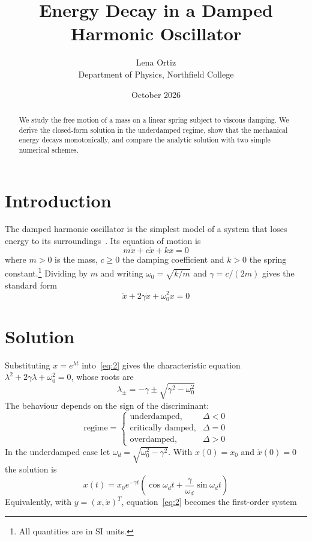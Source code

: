 \documentclass[11pt,a4paper]{article}
\title{Energy Decay in a Damped Harmonic Oscillator}
\author{Lena Ortiz\\ \small Department of Physics, Northfield College}
\date{October 2026}
\begin{document}
\maketitle

\begin{abstract}
We study the free motion of a mass on a linear spring subject to viscous damping. We derive the closed-form solution in the underdamped regime, show that the mechanical energy decays monotonically, and compare the analytic solution with two simple numerical schemes.
\end{abstract}

\section{Introduction}

The damped harmonic oscillator is the simplest model of a system that loses energy to its surroundings~\cite{ref1}. Its equation of motion is
\begin{equation}
  m\ddot{x}+c\dot{x}+kx=0
  \label{eq:1}
\end{equation}
where $m>0$ is the mass, $c\geq0$ the damping coefficient and $k>0$ the spring constant.\footnote{All quantities are in SI units.} Dividing by $m$ and writing $\omega_{0}=\sqrt{k/m}$ and $\gamma=c/(2m)$ gives the standard form
\begin{equation}
  \ddot{x}+2\gamma\dot{x}+\omega_{0}^{2}x=0
  \label{eq:2}
\end{equation}

\section{Solution}

Substituting $x=e^{\lambda t}$ into~\eqref{eq:2} gives the characteristic equation $\lambda^{2}+2\gamma\lambda+\omega_{0}^{2}=0$, whose roots are
\begin{equation}
  \lambda_{\pm}=-\gamma\pm\sqrt{\gamma^{2}-\omega_{0}^{2}}
\end{equation}
The behaviour depends on the sign of the discriminant:
\begin{equation*}
  \text{regime}=\begin{cases}
\text{underdamped}, & \Delta<0 \\
\text{critically damped}, & \Delta=0 \\
\text{overdamped}, & \Delta>0
\end{cases}
\end{equation*}
In the underdamped case let $\omega_{d}=\sqrt{\omega_{0}^{2}-\gamma^{2}}$. With $x(0)=x_{0}$ and $\dot{x}(0)=0$ the solution is
\begin{equation}
  x(t)=x_{0}e^{-\gamma t}\left( \cos\omega_{d}t+\frac{\gamma}{\omega_{d}}\sin\omega_{d}t \right)
  \label{eq:cos-dsin}
\end{equation}
Equivalently, with $y=(x,\dot{x})^{T}$, equation~\eqref{eq:2} becomes the first-order system
\end{document}
